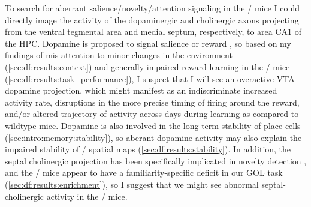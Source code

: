 To search for aberrant salience/novelty/attention signaling in the \df/ mice I could directly image the activity of the dopaminergic and cholinergic axons projecting from the ventral tegmental area and medial septum, respectively, to area CA1 of the \ac{HPC}.
Dopamine is proposed to signal salience or reward \citep{Berridge1998}, so based on my findings of mis-attention to minor changes in the environment (\autoref{sec:df:results:context}) and generally impaired reward learning in the \df/ mice (\autoref{sec:df:results:task_performance}), I suspect that I will see an overactive VTA dopamine projection, which might manifest as an indiscriminate increased activity rate, disruptions in the more precise timing of firing around the reward, and/or altered trajectory of activity across days during learning as compared to wildtype mice.
Dopamine is also involved in the long-term stability of place cells (\autoref{sec:intro:memory:stability}), so aberant dopamine activity may also explain the impaired stability of \df/ spatial maps (\autoref{sec:df:results:stability}).
In addition, the septal cholinergic projection has been specifically implicated in novelty detection \citep{Jeewajee2008, Barry2012c}, and the \df/ mice appear to have a familiarity-specific deficit in our \ac{GOL} task (\autoref{sec:df:results:enrichment}), so I suggest that we might see abnormal septal-cholinergic activity in the \df/ mice.


